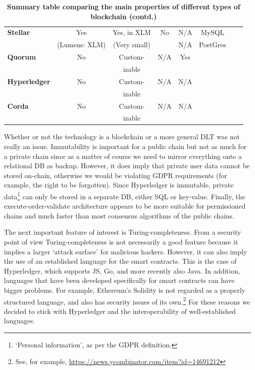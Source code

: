 \begin{table}
\begin{centering}
{\begin{tabular}{| l | c | c | c | c | c | c | c |}
\textbf{Stellar}		&Yes			&Yes, in XLM	&No
				&N/A			&MySQL		&				&\\
				&(Lumens: XLM)&(Very small)	&
				&N/A			&PostGres	&				&\\				
\hline
\textbf{Quorum} 	&No			&Custom-		&N/A
				&Yes			&			&				&\\
			 	&			&izable		&
				& 			&			&				& \\
\hline
\textbf{Hyperledger}	&No			&Custom-		&N/A
				&N/A			&			&				&\\
 				&			&izable		&
				&			&			&				& \\
\hline
\textbf{Corda} 		&No			&Custom-			&N/A
				&N/A			&			&				& \\
		 		&			&izable		&
				& 			&			&				& \\
\hline
\end{tabular}}
\caption{\bf \small Summary table comparing the main properties of different types of blockchain (contd.)}
\label{blockchain_types2}
\end{centering}
\end{table}


Whether or not the technology is a blockchain or a more general DLT was not really an issue. Immutability is important for a public chain but not as much for a private chain since as a matter of course we need to mirror everything onto a relational DB as backup. However, it does imply that private user data cannot be stored on-chain, otherwise we would be violating GDPR requirements (for example, the right to be forgotten). Since Hyperledger is immutable, private data\footnote{`Personal information', as per the GDPR definition.} can only be stored in a separate DB, either SQL or key-value. Finally, the execute-order-validate architecture appears to be more suitable for permissioned chains and much faster than most consensus algorithms of the public chains.

The next important feature of interest is Turing-completeness. From a security point of view Turing-completeness is not necessarily a good feature because it implies a larger `attack surface' for malicious hackers. However, it can also imply the use of an established language for the smart contracts. This is the case of Hyperledger, which supports JS, Go, and more recently also Java. In addition, languages that have been developed specifically for smart contracts can have bigger problems. For example, Ethereum's Solidity is not regarded as a properly structured language, and also has security issues of its own.\footnote{See, for example, \url{https://news.ycombinator.com/item?id=14691212}} For these reasons we decided to stick with Hyperledger and the interoperability of well-established languages.

